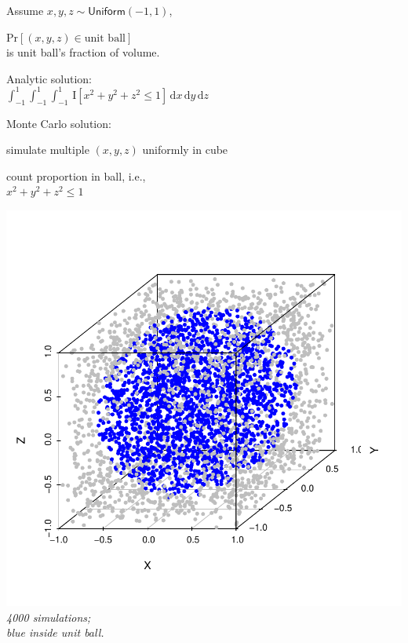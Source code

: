 \documentclass[10pt]{report}
\begin{document}
%

\noindent
\begin{minipage}[t]{0.6\textwidth}
\vspace*{-1.7in}
\begin{subitemize}
\item Assume $x, y, z \sim \mathsf{Uniform}(-1, 1)$,
\item $\mbox{Pr}[(x,y,z) \in \mbox{unit ball}]$ \hfill
\\ is unit ball's fraction of volume.
\item Analytic solution:
\\[4pt]\hspace*{-1em}
$\int_{-1}^1 \int_{-1}^1 \int_{-1}^1 \,
\mathrm{I}[ x^2 + y^2 + z^2 \leq 1 ] \,
\mathrm{d} x \, \mathrm{d} y \, \mathrm{d} z$

\item Monte Carlo solution:
\begin{subsubitemize}
\item simulate multiple $(x, y, z)$ uniformly in cube
\item count proportion in ball, i.e., \\[4pt]
$x^2 + y^2 + z^2 \leq 1$
\end{subsubitemize}
\end{subitemize}
\end{minipage}
\hfill
\begin{minipage}[t]{0.4\textwidth}
\includegraphics[width=1.2\textwidth]{img/ball-in-cube.pdf}
\\[-12pt]
{\footnotesize\slshape \hspace*{0.5in}4000 simulations;
\\\hspace*{0.5in}blue inside unit ball.}
\end{minipage}
\end{document}

